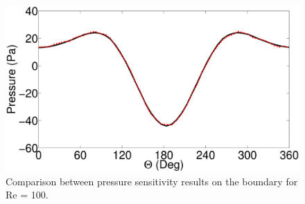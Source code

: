 %
\begin{figure}[H]
    \centering
    \includegraphics[width=12.00cm]{Chapter_4/figure/flow_over_cylinder/pressureSensitivityOnBoundary_RE100.eps}
    \caption{Comparison between pressure sensitivity results on the boundary for Re = 100.}
    \label{fig:C4_flowOverCylidner_pressureSensitivityOnSurface}
\end{figure}
%
